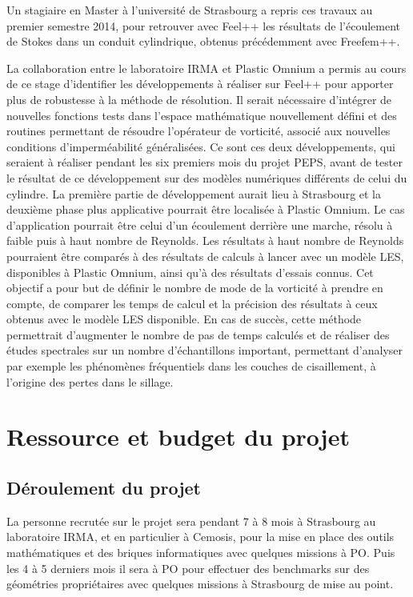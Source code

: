 \documentclass[12pt]{article}
\begin{document}
Un stagiaire en Master à l’université de Strasbourg a  repris ces travaux au
premier semestre 2014, pour retrouver avec Feel++ les résultats de l’écoulement
de Stokes dans un conduit cylindrique, obtenus précédemment avec Freefem++.

La collaboration entre le laboratoire IRMA et Plastic Omnium a permis au cours
de ce stage d’identifier les développements à réaliser sur Feel++ pour apporter
plus de robustesse à la méthode de résolution. Il serait nécessaire d’intégrer
de nouvelles fonctions tests dans l’espace mathématique nouvellement défini et
des routines permettant de résoudre l’opérateur de vorticité, associé aux
nouvelles conditions d’imperméabilité généralisées. Ce sont ces deux
développements, qui seraient à réaliser pendant les six premiers mois du projet
PEPS, avant de tester le résultat de ce développement sur des modèles numériques
différents de celui du cylindre. La première partie de développement aurait lieu
à Strasbourg et la deuxième phase plus applicative pourrait être localisée à
Plastic Omnium. Le cas d’application pourrait être celui d’un écoulement
derrière une marche, résolu à faible puis à haut nombre de Reynolds. Les
résultats à haut nombre de Reynolds pourraient être comparés à des résultats de
calculs à lancer avec un modèle LES, disponibles à Plastic Omnium, ainsi qu’à des
résultats d’essais connus. Cet objectif a pour but de définir le nombre de mode
de la vorticité à prendre en compte, de comparer les temps de calcul et la
précision des résultats à ceux obtenus avec le modèle LES disponible. En cas de
succès, cette méthode permettrait d’augmenter le nombre de pas de temps calculés
et de  réaliser des études spectrales sur un nombre d’échantillons important,
permettant d’analyser par exemple les phénomènes fréquentiels dans les couches
de cisaillement, à l’origine des pertes dans le sillage.



\section{Ressource et budget du projet}
\label{sec:budget}

\subsection{Déroulement du projet}
\label{sec:dero-du-proj}

La personne recrutée sur le projet sera pendant 7 à 8 mois à Strasbourg au
laboratoire IRMA, et en particulier à Cemosis, pour la mise en place des outils
mathématiques et des briques informatiques avec quelques missions à PO. Puis les
4 à 5 derniers mois il sera à PO pour effectuer des benchmarks sur des
géométries propriétaires avec quelques missions à Strasbourg de mise au point.
\end{document}
